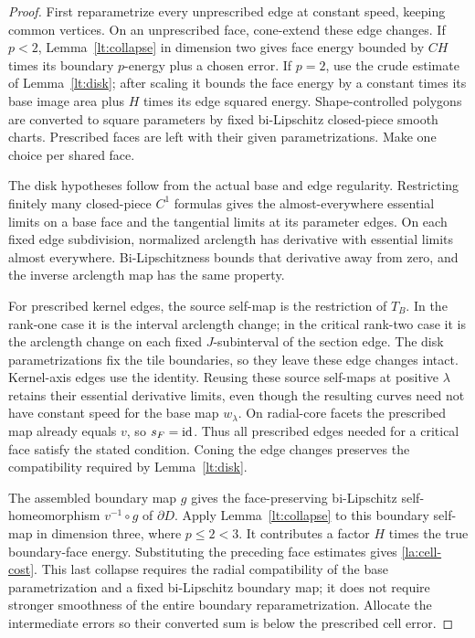\begin{proof}
First reparametrize every unprescribed edge at constant speed,
keeping common vertices.  On an unprescribed face, cone-extend these
edge changes.  If $p<2$, Lemma~\ref{lt:collapse} in dimension two gives
face energy bounded by $CH$ times its boundary $p$-energy plus a
chosen error.  If $p=2$, use the crude estimate of
Lemma~\ref{lt:disk}; after scaling it bounds the face energy by a
constant times its base image area plus $H$ times its edge squared
energy.  Shape-controlled polygons are converted to square
parameters by fixed bi-Lipschitz closed-piece smooth charts.
Prescribed faces are left with their given parametrizations.  Make
one choice per shared face.

The disk hypotheses follow from the actual base and edge regularity.
Restricting finitely many closed-piece $C^1$ formulas gives the
almost-everywhere essential limits on a base face and the tangential
limits at its parameter edges.  On each fixed edge subdivision,
normalized arclength has derivative with essential limits almost
everywhere.  Bi-Lipschitzness bounds that derivative away from zero,
and the inverse arclength map has the same property.

For prescribed kernel edges, the source self-map is the restriction
of $T_B$.  In the rank-one case it is the interval arclength change;
in the critical rank-two case it is the arclength change on each fixed
$J$-subinterval of the section edge.  The disk parametrizations fix the
tile boundaries, so they leave these edge changes intact.  Kernel-axis
edges use the identity.  Reusing these source self-maps at positive
$\lambda$ retains their essential derivative limits, even though the
resulting curves need not have constant speed for the base map
$w_\lambda$.  On radial-core facets the prescribed map already equals
$v$, so $s_F=\operatorname{id}$.  Thus all prescribed edges needed for a critical
face satisfy the stated condition.  Coning the edge changes preserves the
compatibility required by Lemma~\ref{lt:disk}.

The assembled boundary map $g$ gives the face-preserving bi-Lipschitz
self-homeomorphism $v^{-1}\circ g$ of $\partial D$.  Apply
Lemma~\ref{lt:collapse} to this boundary self-map in dimension three,
where $p\le2<3$.
It contributes a factor $H$ times the true boundary-face energy.
Substituting the preceding face estimates gives
\eqref{la:cell-cost}.  This last collapse requires the radial
compatibility of the base parametrization and a fixed bi-Lipschitz
boundary map; it does not require stronger smoothness of the entire
boundary reparametrization.  Allocate the intermediate errors so
their converted sum is below the prescribed cell error.
\end{proof}

